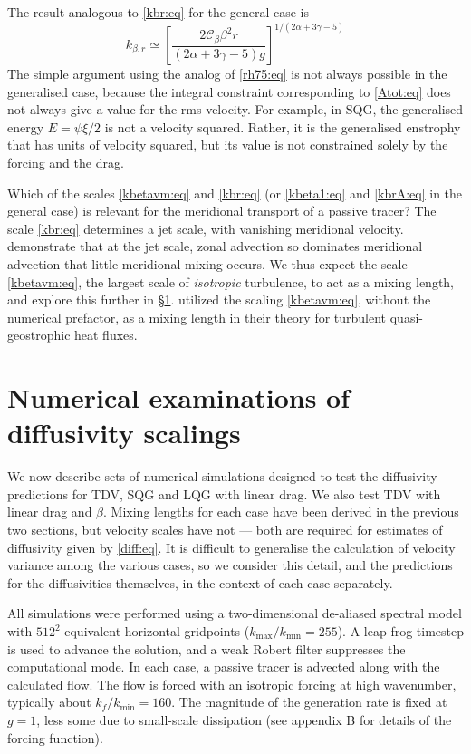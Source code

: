 \documentclass{jfm}
\newcommand{\ca}  [1]{\mathcal{#1}}
\begin{document}
The result analogous to \eqref{kbr:eq} for the general case is
\begin{equation}
k_{\beta,r} \simeq \left[\frac{2\ca{C}_{\beta}\beta^2r}
{(2\alpha+3\gamma-5)g}\right]^{1/(2\alpha+3\gamma-5)}
\label{kbrA:eq}
\end{equation}
The simple argument using the analog of \eqref{rh75:eq} is not always
possible in the generalised case, because the integral constraint
corresponding to \eqref{Atot:eq} does not always give a value for the
rms velocity. For example, in SQG, the generalised energy
$E=\overline{\psi\xi}/2$ is not a velocity squared. Rather, it is the
generalised enstrophy that has units of velocity squared, but its value
is not constrained solely by the forcing and the drag.

Which of the scales \eqref{kbetavm:eq} and \eqref{kbr:eq} (or
\eqref{kbeta1:eq} and \eqref{kbrA:eq} in the general case) is relevant
for the meridional transport of a passive tracer? The scale
\eqref{kbr:eq} determines a jet scale, with vanishing meridional
velocity. \citet{Bartello91} demonstrate that at the jet scale, zonal
advection so dominates meridional advection that little meridional
mixing occurs.  We thus expect the scale \eqref{kbetavm:eq}, the
largest scale of \textit{isotropic} turbulence, to act as a mixing
length, and explore this further in \S \ref{numerics:sec}.
\citet{Held96} utilized the scaling \eqref{kbetavm:eq}, without the
numerical prefactor, as a mixing length in their theory for turbulent
quasi-geostrophic heat fluxes.

\section{Numerical examinations of diffusivity scalings}
\label{numerics:sec}

We now describe sets of numerical simulations designed to test the
diffusivity predictions for TDV, SQG and LQG with linear drag.  We
also test TDV with linear drag and $\beta$.  Mixing lengths for each
case have been derived in the previous two sections, but velocity
scales have not --- both are required for estimates of diffusivity
given by \eqref{diff:eq}.  It is difficult to generalise the
calculation of velocity variance among the various cases, so we
consider this detail, and the predictions for the diffusivities
themselves, in the context of each case separately.

All simulations were performed using a two-dimensional de-aliased
spectral model with $512^2$ equivalent horizontal gridpoints
($k_{\mathrm{max}}/k_{\mathrm{min}} = 255$). A leap-frog timestep is
used to advance the solution, and a weak Robert filter suppresses the
computational mode.  In each case, a passive tracer is advected along
with the calculated flow.  The flow is forced with an isotropic
forcing at high wavenumber, typically about $k_f/k_{\mathrm{min}} =
160$.  The magnitude of the generation rate is fixed at $g=1$, less
some due to small-scale dissipation (see appendix B for details of the
forcing function).
\end{document}
